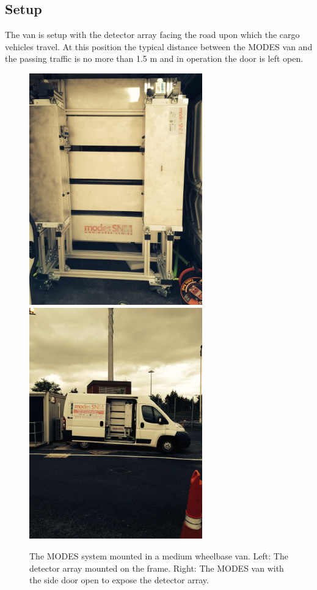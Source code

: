 \subsection{Setup}
The van is setup with the detector array facing the road upon which the cargo vehicles travel. At this position the typical distance between the MODES van and the passing traffic is no more than 1.5 m and in operation the door is left open.

\begin{figure}
\begin{center}
\includegraphics[width=75mm]{./Chapter7/figures/detectorArrayInVan.jpg}
\includegraphics[width=75mm]{./Chapter7/figures/modes_van1.jpg}
\end{center}
\caption{The MODES system mounted in a medium wheelbase van. Left: The detector array mounted on the frame. Right: The MODES van with the side door open to expose the detector array.}
\label{fig:modesVanHeathrow}
\end{figure}

